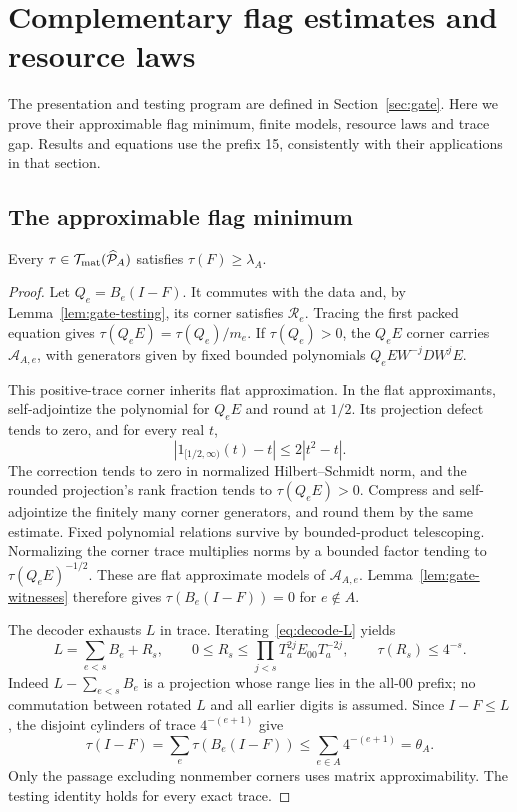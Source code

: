 \section{Complementary flag estimates and resource laws}\label{app:gate-estimates}
The presentation and testing program are defined in Section~\ref{sec:gate}. Here we prove their approximable flag minimum, finite models, resource laws and trace gap. Results and equations use the prefix 15, consistently with their applications in that section.
\renewcommand{\thetheorem}{15.\arabic{theorem}}
\renewcommand{\thelemma}{\thetheorem}
\renewcommand{\theproposition}{\thetheorem}
\renewcommand{\thecorollary}{\thetheorem}
\renewcommand{\theequation}{15.\arabic{equation}}
\setcounter{theorem}{3}
\setcounter{equation}{6}
\subsection{The approximable flag minimum}
\begin{proposition}\label{prop:gate-flag}
Every $\tau\in\mathcal T_{\rm mat}(\widehat{\mathcal P}_A)$ satisfies $\tau(F)\ge\lambda_A$.
\end{proposition}
\begin{proof}
Let $Q_e=B_e(I-F)$. It commutes with the data and, by Lemma~\ref{lem:gate-testing}, its corner satisfies $\mathcal R_e$. Tracing the first packed equation gives $\tau(Q_eE)=\tau(Q_e)/m_e$. If $\tau(Q_e)>0$, the $Q_eE$ corner carries $\mathcal A_{A,e}$, with generators given by fixed bounded polynomials $Q_eEW^{-j}DW^jE$.

This positive-trace corner inherits flat approximation. In the flat approximants, self-adjointize the polynomial for $Q_eE$ and round at $1/2$. Its projection defect tends to zero, and for every real $t$,
\[
 |1_{[1/2,\infty)}(t)-t|\le2|t^2-t|.
\]
The correction tends to zero in normalized Hilbert--Schmidt norm, and the rounded projection's rank fraction tends to $\tau(Q_eE)>0$. Compress and self-adjointize the finitely many corner generators, and round them by the same estimate. Fixed polynomial relations survive by bounded-product telescoping. Normalizing the corner trace multiplies norms by a bounded factor tending to $\tau(Q_eE)^{-1/2}$. These are flat approximate models of $\mathcal A_{A,e}$. Lemma~\ref{lem:gate-witnesses} therefore gives $\tau(B_e(I-F))=0$ for $e\notin A$.

The decoder exhausts $L$ in trace. Iterating~\eqref{eq:decode-L} yields
\[
 L=\sum_{e<s}B_e+R_s,\qquad
 0\le R_s\le\prod_{j<s}T_a^{2j}E_{00}T_a^{-2j},\qquad \tau(R_s)\le4^{-s}.
\]
Indeed $L-\sum_{e<s}B_e$ is a projection whose range lies in the all-00 prefix; no commutation between rotated $L$ and all earlier digits is assumed. Since $I-F\le L$, the disjoint cylinders of trace $4^{-(e+1)}$ give
\[
 \tau(I-F)=\sum_e\tau(B_e(I-F))
 \le\sum_{e\in A}4^{-(e+1)}=\theta_A.
\]
Only the passage excluding nonmember corners uses matrix approximability. The testing identity holds for every exact trace.
\end{proof}

